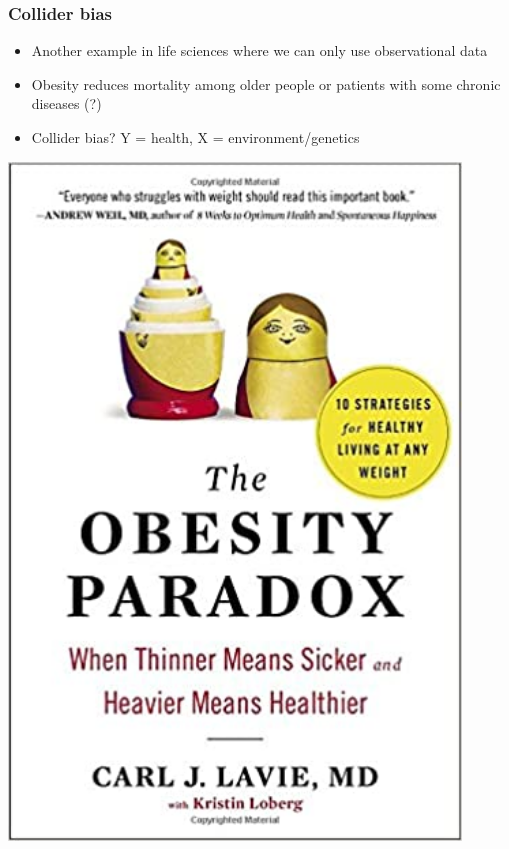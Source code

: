 \documentclass[aspectratio=43]{beamer}
\begin{document}
\begin{frame}
\frametitle{Collider bias}
\centering

\begin{minipage}{.54\textwidth}\centering
\begin{itemize}
  \item Another example in life sciences where we can only use observational data
  \item Obesity reduces mortality among older people or patients with some chronic diseases (?)
  \item Collider bias? Y = health, X = environment/genetics
\end{itemize}
\end{minipage}\hfill
\begin{minipage}{0.45\textwidth}\centering
\includegraphics[width = 0.9\textwidth]{../img/obesity_paradox}
\end{minipage}

\end{frame}
\end{document}
